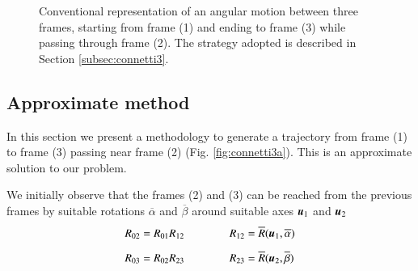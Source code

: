 \begin{figure}[tbp]
\begin{minipage}[t]{0.49\textwidth}
        \caption{Conventional representation of an angular motion between three frames, starting from frame (1) and ending to frame (3) while passing through frame (2). The strategy adopted is described in Section \ref{subsec:connetti3}.}
        \label{fig:connetti3}
    \end{minipage}
\end{figure}


\subsection{Approximate method}
\label{subsec:connetti3appr}
In this section we present a methodology to generate a trajectory from frame (1) to frame (3) passing near frame (2) (Fig. \ref{fig:connetti3a}). This is an approximate solution to our problem.

We initially observe that the frames (2) and (3) can be reached from the previous frames by suitable rotations $\overline{\alpha}$ and $\overline{\beta}$ around suitable axes ${\boldsymbol{u}}_1$ and ${\boldsymbol{u}}_2$
\begin{equation}
    \begin{array}{l}
        R_{02} = R_{01}R_{12} 
        \qquad\qquad 
        R_{12} = \overline{R}({\boldsymbol{u}}_1,\overline{\alpha})\\[2ex]
        R_{03} = R_{02}R_{23} 
        \qquad\qquad  
        R_{23} = \overline{R}({\boldsymbol{u}}_2,\overline{\beta})
    \end{array}
    \label{eq:rotA,B}
\end{equation}

